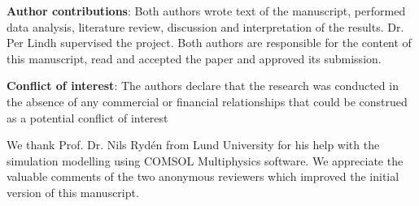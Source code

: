 \documentclass[USenglish,twocolumn]{article}
\begin{document}
\vspace{5pt}

\noindent
\textbf{Author contributions}: Both authors wrote text of the manuscript, performed data analysis, literature review, discussion and interpretation of the results. Dr. Per Lindh supervised the project. Both authors are responsible for the content of this manuscript, read and accepted the paper and approved its submission.

\vspace{5pt}

\noindent
\textbf{Conflict of interest}: The authors declare that the research was conducted in the absence of any commercial or financial relationships that could be construed as a potential conflict of interest

\begin{acknowledgement}
We thank Prof. Dr. Nils Ryd\'{e}n from Lund University for his help with the simulation modelling using COMSOL Multiphysics software. We appreciate the valuable comments of the two anonymous reviewers which improved the initial version of this manuscript. 
\end{acknowledgement}



\end{document}
